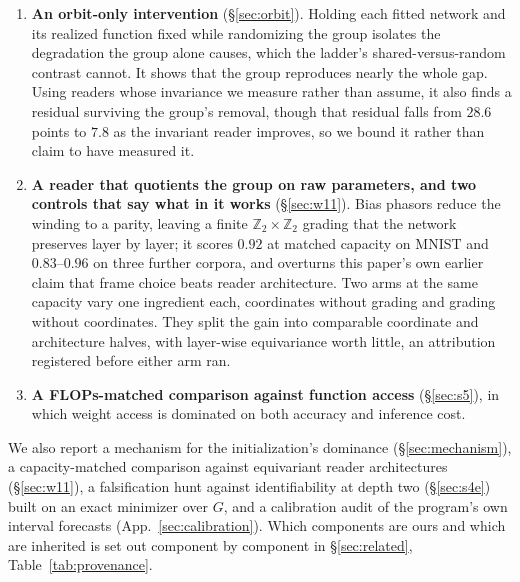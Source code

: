 \documentclass[10pt,twocolumn,letterpaper]{article}
\theoremstyle{definition}
\newcommand{\Z}{\mathbb{Z}}
\begin{document}
\begin{enumerate}
feature maps applied to the same corpora and decoded by one frozen apparatus separate the gap
into what an exact change of frame removes and what it cannot. Registered before any cell was
computed, and scored against the frozen text.
\item \textbf{An orbit-only intervention} (\S\ref{sec:orbit}). Holding each fitted network and its
realized function fixed while randomizing the group isolates the degradation the group alone
causes, which the ladder's shared-versus-random contrast cannot. It shows that the group reproduces
nearly the whole gap. Using readers whose invariance we measure rather than assume, it also finds a
residual surviving the group's removal, though that residual falls from $28.6$ points to $7.8$ as
the invariant reader improves, so we bound it rather than claim to have measured it.
\item \textbf{A reader that quotients the group on raw parameters, and two controls that say what
in it works} (\S\ref{sec:w11}). Bias phasors reduce the winding to a parity, leaving a finite
$\Z_2\times\Z_2$ grading that the network preserves layer by layer; it scores $0.92$ at matched capacity on MNIST and $0.83$--$0.96$ on three
further corpora, and overturns this paper's own earlier claim that frame choice beats reader
architecture. Two arms at the same capacity vary one ingredient each, coordinates without grading and grading
without coordinates. They split the gain into comparable coordinate and architecture halves, with
layer-wise equivariance worth little, an attribution registered before either arm ran.
\item \textbf{A FLOPs-matched comparison against function access} (\S\ref{sec:s5}), in which
weight access is dominated on both accuracy and inference cost.
\end{enumerate}

We also report a mechanism for the initialization's dominance (\S\ref{sec:mechanism}), a
capacity-matched comparison against equivariant reader architectures (\S\ref{sec:w11}), a
falsification hunt against identifiability at depth two (\S\ref{sec:s4e}) built on an exact
minimizer over $G$, and a calibration audit of the program's own interval forecasts
(App.~\ref{sec:calibration}). Which components are ours and which are inherited is set out
component by component in \S\ref{sec:related}, Table~\ref{tab:provenance}.
\end{document}
